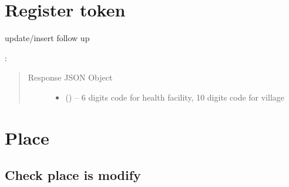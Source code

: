 \documentclass[letterpaper,10pt,english,openany,oneside]{sphinxmanual}
\begin{document}
\section{Register token}
\label{\detokenize{api/v4:register-token}}

\begin{fulllineitems}
\label{\detokenize{api/v4:post--api4-Notification-update_token}}
\sphinxAtStartPar
update/insert follow up

\sphinxAtStartPar
{}:

\begin{sphinxVerbatim}[commandchars=\\\{\}]
   
   
   
\end{sphinxVerbatim}
\begin{quote}\begin{description}
\item[{Response JSON Object}] \leavevmode\begin{itemize}
\item {} 
\sphinxAtStartPar
{} () – 6 digits code for health facility, 10 digits code for village

\end{itemize}

\end{description}\end{quote}

\end{fulllineitems}



\section{Place}
\label{\detokenize{api/v4:place}}

\subsection{Check place is modify}
\label{\detokenize{api/v4:check-place-is-modify}}
\end{document}
